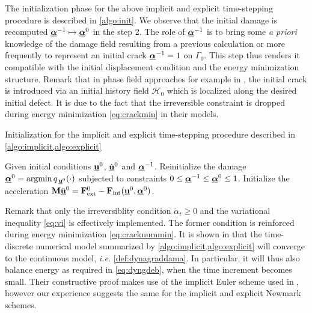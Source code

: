 The initialization phase for the above implicit and explicit time-stepping procedure is described in \cref{algo:init}. We observe that the initial damage is recomputed $\dvec^{-1}\mapsto\dvec^0$ in the step 2. The role of $\dvec^{-1}$ is to bring some \emph{a priori} knowledge of the damage field resulting from a previous calculation or more frequently to represent an initial crack $\dvec^{-1}=1$ on $\Gamma_0$. This step thus renders it compatible with the initial displacement condition and the energy minimization structure. Remark that in phase field approaches for example in \cite{BordenVerhooselScottHughesLandis:2012}, the initial crack is introduced via an initial history field $\mathcal{H}_0$ which is localized along the desired initial defect. It is due to the fact that the irreversible constraint is dropped during energy minimization \eqref{eq:crackmin} in their models.
\begin{algorithm}[htbp]
\caption{Initialization for the implicit and explicit time-stepping procedure described in \cref{algo:implicit,algo:explicit}} \label{algo:init}
\begin{algorithmic}[1]\linespread{1.2}\selectfont\normalsize
\State Given initial conditions $\uvec^0$, $\dot{\uvec}^0$ and $\dvec^{-1}$.
\State Reinitialize the damage $\dvec^0=\operatorname{arg min}q_{\,\uvec^0}(\cdot)$ subjected to constraints $0\leq\dvec^{-1}\leq\dvec^0\leq 1$.
\State Initialize the acceleration $\vec{M}\ddot{\uvec}^0=\vec{F}_\mathrm{ext}^0-\vec{F}_\mathrm{int}(\uvec^0,\dvec^0)$.
\end{algorithmic}
\end{algorithm}

\begin{remark}
Remark that only the irreversiblity condition $\dot{\alpha}_t\geq 0$ and the variational inequality \eqref{eq:vi} is effectively implemented. The former condition is reinforced during energy minimization \eqref{eq:cracknummin}. It is shown in \cite{LarsenOrtnerSuli:2010} that the time-discrete numerical model summarized by \cref{algo:implicit,algo:explicit} will converge to the continuous model, \emph{i.e.} \cref{def:dynagraddama}. In particular, it will thus also balance energy as required in \eqref{eq:dyngdeb}, when the time increment becomes small. Their constructive proof makes use of the implicit Euler scheme used in \cite{Bourdin:2011}, however our experience suggests the same for the implicit and explicit Newmark schemes.
\end{remark}

